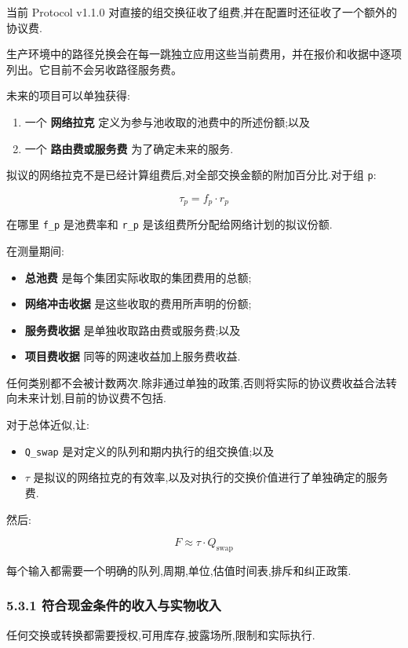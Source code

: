 \documentclass[11pt]{article}
\begin{document}
当前 Protocol v1.1.0 对直接的组交换征收了组费,并在配置时还征收了一个额外的协议费.

生产环境中的路径兑换会在每一跳独立应用这些当前费用，并在报价和收据中逐项列出。它目前不会另收路径服务费。

未来的项目可以单独获得:

\begin{enumerate}[leftmargin=*]
\item 一个 \textbf{网络拉克} 定义为参与池收取的池费中的所述份额;以及
\item 一个 \textbf{路由费或服务费} 为了确定未来的服务.
\end{enumerate}
拟议的网络拉克不是已经计算组费后,对全部交换金额的附加百分比.对于组 \texttt{p}:

\[
\tau_p = f_p \cdot r_p
\]

在哪里 \texttt{f\_p} 是池费率和 \texttt{r\_p} 是该组费所分配给网络计划的拟议份额.

在测量期间:

\begin{itemize}[leftmargin=*]
\item \textbf{总池费} 是每个集团实际收取的集团费用的总额;
\item \textbf{网络冲击收据} 是这些收取的费用所声明的份额;
\item \textbf{服务费收据} 是单独收取路由费或服务费;以及
\item \textbf{项目费收据} 同等的网速收益加上服务费收益.
\end{itemize}
任何类别都不会被计数两次.除非通过单独的政策,否则将实际的协议费收益合法转向未来计划,目前的协议费不包括.

对于总体近似,让:

\begin{itemize}[leftmargin=*]
\item \texttt{Q\_swap} 是对定义的队列和期内执行的组交换值;以及
\item \texttt{$\tau$} 是拟议的网络拉克的有效率,以及对执行的交换价值进行了单独确定的服务费.
\end{itemize}
然后:

\[
F \approx \tau \cdot Q_{\mathrm{swap}}
\]

每个输入都需要一个明确的队列,周期,单位,估值时间表,排斥和纠正政策.

\subsubsection*{5.3.1 符合现金条件的收入与实物收入}

任何交换或转换都需要授权,可用库存,披露场所,限制和实际执行.
\end{document}
